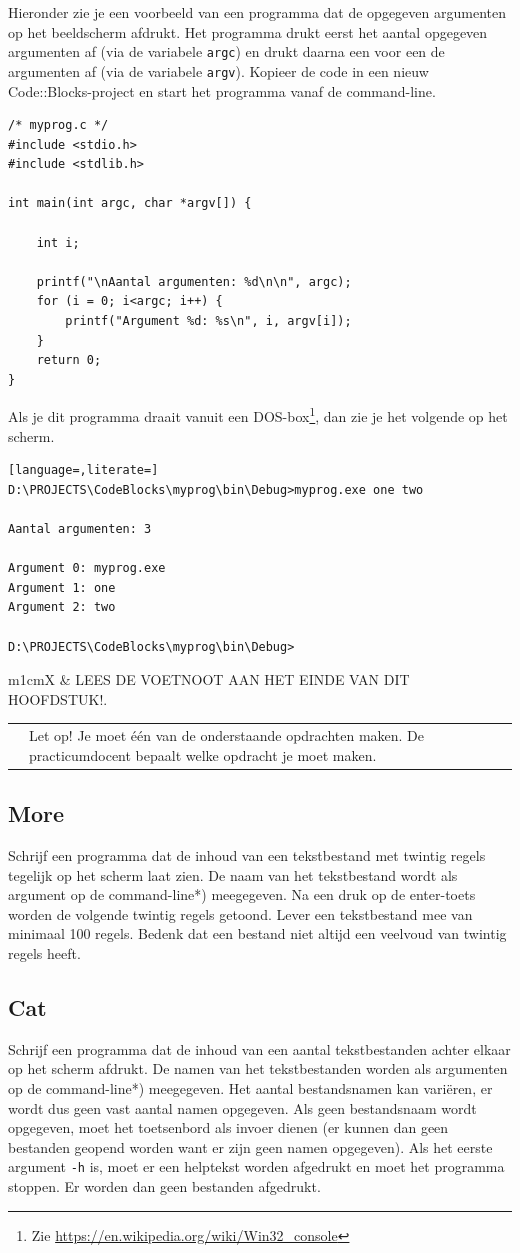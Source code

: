 \documentclass[a4paper,10pt,fleqn,twoside]{article}
\newcommand{\letop}{%
\vspace*{2ex}
\begin{mdframed}[outerlinewidth = 1 ,%
roundcorner = 4 pt,%
leftmargin = 40,%
rightmargin = 40,%
backgroundcolor = yellow!40,%
outerlinecolor = red!70!black,%
innertopmargin = \topskip,%
splittopskip = \topskip,%
]
\begin{tabularx}{\linewidth}{m{1cm}X}
\Large\leftpointright & Let op! Je moet één van de onderstaande opdrachten maken. De practicumdocent bepaalt welke opdracht je moet maken.
\end{tabularx}
\end{mdframed}
}
\newcommand{\leesvoetnoot}{%
\vspace*{2ex}
\begin{mdframed}[outerlinewidth = 1 ,%
roundcorner = 4 pt,%
leftmargin = 40,%
rightmargin = 40,%
backgroundcolor = yellow!40,%
outerlinecolor = red!70!black,%
innertopmargin = \topskip,%
splittopskip = \topskip,%
]
\begin{tabularx}{\linewidth}{m{1cm}X}
\Large\leftpointright & LEES DE VOETNOOT AAN HET EINDE VAN DIT HOOFDSTUK!.
\end{tabularx}
\end{mdframed}
}
\begin{document}
Hieronder zie je een voorbeeld van een programma dat de opgegeven argumenten op het beeldscherm afdrukt. Het programma drukt eerst het aantal opgegeven argumenten af (via de variabele \lstinline|argc|) en drukt daarna een voor een de argumenten af (via de variabele \lstinline|argv|).
Kopieer de code in een nieuw Code::Blocks-project en start het programma vanaf de command-line.

\begin{lstlisting}
/* myprog.c */
#include <stdio.h>
#include <stdlib.h>

int main(int argc, char *argv[]) {

    int i;

    printf("\nAantal argumenten: %d\n\n", argc);
    for (i = 0; i<argc; i++) {
        printf("Argument %d: %s\n", i, argv[i]);
    }
    return 0;
}
\end{lstlisting}

Als je dit programma draait vanuit een DOS-box\footnote{Zie \url{https://en.wikipedia.org/wiki/Win32_console}}, dan zie je het volgende op het scherm.

\begin{lstlisting}[language=,literate=]
D:\PROJECTS\CodeBlocks\myprog\bin\Debug>myprog.exe one two

Aantal argumenten: 3

Argument 0: myprog.exe
Argument 1: one
Argument 2: two

D:\PROJECTS\CodeBlocks\myprog\bin\Debug>
\end{lstlisting}

\leesvoetnoot

\letop

\subsection{More}
Schrijf een programma dat de inhoud van een tekstbestand met twintig regels tegelijk op het scherm laat zien. De naam van het tekstbestand wordt als argument op de command-line*) meegegeven. Na een druk op de enter-toets worden de volgende twintig regels getoond. Lever een tekstbestand mee van minimaal 100 regels. Bedenk dat een bestand niet altijd een veelvoud van twintig regels heeft.

\subsection{Cat}
Schrijf een programma dat de inhoud van een aantal tekstbestanden achter elkaar op het scherm afdrukt. De namen van het tekstbestanden worden als argumenten op de command-line*) meegegeven. Het aantal bestandsnamen kan variëren, er wordt dus geen vast aantal namen opgegeven. Als geen bestandsnaam wordt opgegeven, moet het toetsenbord als invoer dienen (er kunnen dan geen bestanden geopend worden want er zijn geen namen opgegeven). Als het eerste argument \lstinline|-h| is, moet
er een helptekst worden afgedrukt en moet het programma stoppen. Er worden dan geen bestanden afgedrukt.
\end{document}
